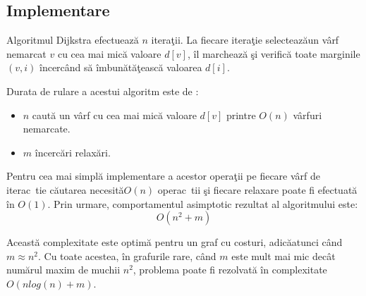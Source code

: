 \documentclass[11pt,a4paper]{report}
\begin{document}
   \subsection{Implementare}
   
   
   Algoritmul Dijkstra efectueaz\u a $n$ itera\c tii. La fiecare itera\c tie selecteaz\u aun v\^ arf nemarcat $v$ cu cea mai mic\u a valoare $d[v]$, \^ il marcheaz\u a \c si verific\u a toate marginile $(v,i)$ \^ incerc\^ and s\u a \^ imbun\u at\u a\c teasc\u a valoarea $d[i]$.
   
   Durata de rulare a acestui algoritm este de :
   \begin{itemize}
   	\item $n$ caut\u a un v\^ arf cu cea mai mic\u a valoare $d[v]$ printre $O(n)$ v\^ arfuri nemarcate.
   	\item $m$ \^ incerc\u ari relax\u ari.
   \end{itemize}

Pentru cea mai simpl\u a implementare a acestor opera\c tii pe fiecare v\^ arf de iterac\ tie c\u autarea necesit\u a$O(n)$ operac\ tii \c si fiecare relaxare poate fi efectuat\u a \^ in $O(1)$. Prin urmare, comportamentul asimptotic rezultat al algoritmului este:
\begin{equation*}
O(n^2+m)
\end{equation*}

Aceast\u a complexitate este optim\u a pentru un graf cu costuri, adic\u aatunci c\^ and $m\approx n^2$. Cu toate acestea, \^ in grafurile rare, c\^ and $m$ este mult mai mic dec\^ at num\u arul maxim de muchii $n^2$, problema poate fi rezolvat\u a \^ in complexitate $O(nlog(n)+m)$. 
    
\end{document}
